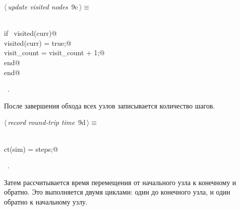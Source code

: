 \documentclass{article}
\begin{document}
\begin{flushleft} \small
\begin{minipage}{\linewidth}\label{scrap8}\raggedright\small
{} $\langle\,${\itshape update visited nodes}\nobreak\ {\footnotesize {9c}}$\,\rangle\equiv$
\vspace{-1ex}
\begin{list}{}{} \item
\mbox{}\verb@@\\
\mbox{}\verb@            if ~visited(curr)@\\
\mbox{}\verb@                visited(curr) = true;@\\
\mbox{}\verb@                visit_count = visit_count + 1;@\\
\mbox{}\verb@            end@\\
\mbox{}\verb@        end@\\
\mbox{}\verb@@{\NWsep}
\end{list}
\vspace{-1.5ex}
\footnotesize
\begin{list}{}{\setlength{\itemsep}{-\parsep}\setlength{\itemindent}{-\leftmargin}}
\item \NWtxtMacroRefIn\ .

\item{}
\end{list}
\end{minipage}\vspace{4ex}
\end{flushleft}
После завершения обхода всех узлов записывается количество шагов.

\begin{flushleft} \small
\begin{minipage}{\linewidth}\label{scrap9}\raggedright\small
{} $\langle\,${\itshape record round-trip time}\nobreak\ {\footnotesize {9d}}$\,\rangle\equiv$
\vspace{-1ex}
\begin{list}{}{} \item
\mbox{}\verb@@\\
\mbox{}\verb@        ct(sim) = steps;@\\
\mbox{}\verb@@{\NWsep}
\end{list}
\vspace{-1.5ex}
\footnotesize
\begin{list}{}{\setlength{\itemsep}{-\parsep}\setlength{\itemindent}{-\leftmargin}}
\item \NWtxtMacroRefIn\ .

\item{}
\end{list}
\end{minipage}\vspace{4ex}
\end{flushleft}
Затем рассчитывается время перемещения от начального узла к конечному и обратно. Это выполняется двумя циклами: один до конечного узла, и один обратно к начальному узлу.
\end{document}
